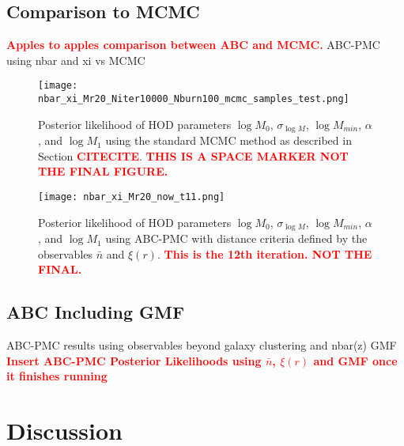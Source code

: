 \documentclass[12pt, preprint]{aastex}
\newcommand{\todo}[1]{{\bf \textcolor{red}{ #1}}}
\begin{document}
\subsection{Comparison to MCMC}
\todo{Apples to apples comparison between ABC and MCMC.}
ABC-PMC using nbar and xi vs MCMC
\begin{figure*}
\begin{center}
\texttt{[image: nbar\_xi\_Mr20\_Niter10000\_Nburn100\_mcmc\_samples\_test.png]}
\caption{Posterior likelihood of HOD parameters $\log M_0$, 
$\sigma_{\log M}$, $\log M_{min}$, $\alpha$, and $\log M_1$ using the
standard MCMC method as described in Section \todo{CITECITE}. 
\todo{THIS IS A SPACE MARKER NOT THE FINAL FIGURE.}}
\label{fig:post_abc_nbarxi}
\end{center}
\end{figure*}
\begin{figure*}
\begin{center}
\texttt{[image: nbar\_xi\_Mr20\_now\_t11.png]}
\caption{Posterior likelihood of HOD parameters $\log M_0$, 
$\sigma_{\log M}$, $\log M_{min}$, $\alpha$, and $\log M_1$ using ABC-PMC 
with distance criteria defined by the observables $\bar{n}$ and $\xi(r)$.
\todo{This is the 12th iteration. NOT THE FINAL.}}
\label{fig:post_abc_nbarxi}
\end{center}
\end{figure*}

\subsection{ABC Including GMF}
ABC-PMC results using observables beyond galaxy clustering and nbar(z) GMF
\todo{Insert ABC-PMC Posterior Likelihoods using $\bar{n}$, $\xi(r)$ and GMF 
once it finishes running}


\section{Discussion}\label{sec:discussion}
\end{document}
